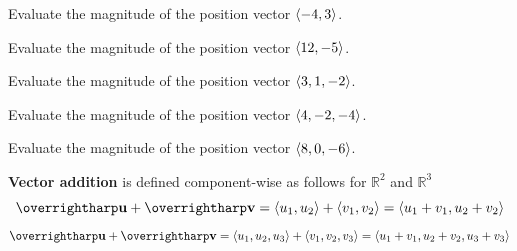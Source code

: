 \documentclass[letterpaper, twoside, 12pt]{book}
\begin{document}
          \begin{solution}

          \end{solution}

          \begin{problem}
            Evaluate the magnitude of the position vector $\langle-4,3\rangle$.
          \end{problem}

          \begin{solution}

          \end{solution}

          \begin{problem}
            Evaluate the magnitude of the position vector $\langle12,-5\rangle$.
          \end{problem}

          \begin{solution}

          \end{solution}

          \begin{problem}
            Evaluate the magnitude of the position vector $\langle3,1,-2\rangle$.
          \end{problem}

          \begin{solution}

          \end{solution}

          \begin{problem}
            Evaluate the magnitude of the position vector $\langle4,-2,-4\rangle$.
          \end{problem}

          \begin{solution}

          \end{solution}

          \begin{problem}
            Evaluate the magnitude of the position vector $\langle8,0,-6\rangle$.
          \end{problem}

          \begin{solution}

          \end{solution}



\begin{definition}
  \textbf{Vector addition} is defined component-wise as follows for
  $\mathbb{R}^2$ and $\mathbb{R}^3$
  \[
    \harpvec{u}+\harpvec{v}
      =
    \<u_1,u_2\>+\<v_1,v_2\>
      =
    \<u_1+v_1,u_2+v_2\>
  \]
  \[
    \harpvec{u}+\harpvec{v}
      =
    \<u_1,u_2,u_3\>+\<v_1,v_2,v_3\>
      =
    \<u_1+v_1,u_2+v_2,u_3+v_3\>
  \]
\end{definition}
\end{document}
